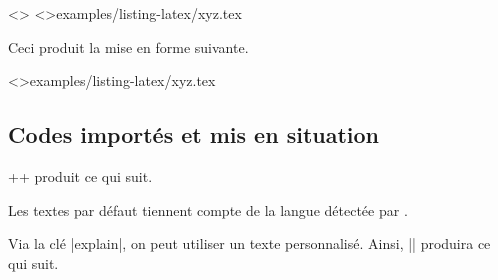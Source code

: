 \documentclass{tutodoc}
\begin{document}
\begin{tdocexa}[Personnaliser]
    \leavevmode

    \begin{tdoclatex}<>
\tdoclatexinput[style=igor, showspaces]<>{examples/listing-latex/xyz.tex}
    \end{tdoclatex}

    Ceci produit la mise en forme suivante.

	\tdoclatexinput[style = igor, showspaces]<>{examples/listing-latex/xyz.tex}
\end{tdocexa}



\subsection{Codes importés et mis en situation}
\label{tutodoc-listing-latexshow}

\begin{tdocexa}
    \tdoclatexin++ produit ce qui suit.

    \medskip

    \begin{tdocshowcaseDOC}
    \end{tdocshowcaseDOC}
\end{tdocexa}


\begin{tdocnote}
    Les textes par défaut tiennent compte de la langue détectée par \thisproj.
\end{tdocnote}


\begin{tdocexa}
    Via la clé \tdoclatexin|explain|, on peut utiliser un texte personnalisé. Ainsi, \tdoclatexin|| produira ce qui suit.

    \medskip

    \begin{tdocshowcaseDOC}
    \end{tdocshowcaseDOC}
\end{tdocexa}
\end{document}
